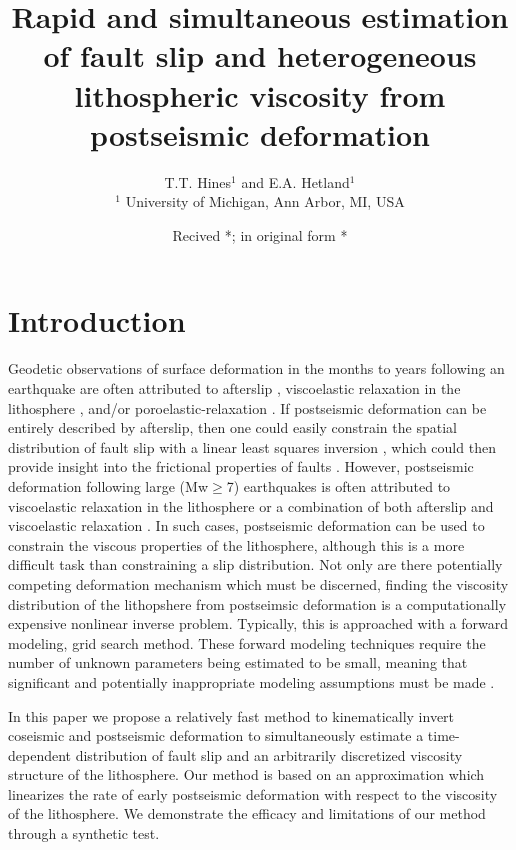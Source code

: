 \documentclass[extra]{gji}
\title{Rapid and simultaneous estimation of fault slip and
  heterogeneous lithospheric viscosity from postseismic deformation}
\author[T.T. Hines and E.A Hetland]{T.T. Hines$^1$ and E.A. Hetland$^1$\\
                    $^1$ University of Michigan, 
                         Ann Arbor, MI, USA}
\date{Recived *; in original form *}
\begin{document}
\label{firstpage}

\maketitle

\begin{summary}
\end{summary}

\begin{keywords}
\end{keywords}

\section{Introduction}
Geodetic observations of surface deformation in the months to years
following an earthquake are often attributed to afterslip
\citep[e.g.][]{M1991}, viscoelastic relaxation in the lithosphere
\citep[e.g.][]{NM1974}, and/or poroelastic-relaxation
\citep[e.g.][]{P1998,J2003}.  If postseismic deformation can be
entirely described by afterslip, then one could easily constrain the
spatial distribution of fault slip with a linear least squares
inversion \citep[e.g.][]{H1987,B2002,F2007}, which could then provide
insight into the frictional properties of faults
\citep[e.g.][]{H2006,B2009}.  However, postseismic deformation
following large (Mw$\geq$7) earthquakes is often attributed to
viscoelastic relaxation in the lithosphere
\citep[e.g.][]{HH2003,P2003,P2005} or a combination of both afterslip
and viscoelastic relaxation \citep[e.g.][]{F2006,H2008,J2009,R2015}.
In such cases, postseismic deformation can be used to constrain the
viscous properties of the lithosphere, although this is a more
difficult task than constraining a slip distribution.  Not only are
there potentially competing deformation mechanism which must be
discerned, finding the viscosity distribution of the lithopshere from
postseimsic deformation is a computationally expensive nonlinear
inverse problem.  Typically, this is approached with a forward
modeling, grid search method.  These forward modeling techniques
require the number of unknown parameters being estimated to be small,
meaning that significant and potentially inappropriate modeling
assumptions must be made \citep{RG2008,H2013}.

In this paper we propose a relatively fast method to kinematically
invert coseismic and postseismic deformation to simultaneously
estimate a time-dependent distribution of fault slip and an
arbitrarily discretized viscosity structure of the lithosphere.  Our
method is based on an approximation which linearizes the rate of early
postseismic deformation with respect to the viscosity of the
lithosphere.  We demonstrate the efficacy and limitations of our
method through a synthetic test.
\end{document}

